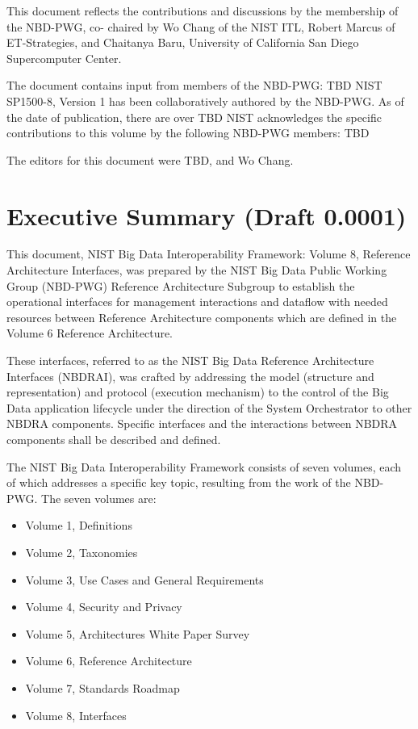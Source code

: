 \documentclass[11pt]{article}
\begin{document}
This document reflects the contributions and discussions by the membership of the NBD-PWG, co-
chaired by Wo Chang of the NIST ITL, Robert Marcus of ET-Strategies, and Chaitanya Baru, University 
of California San Diego Supercomputer Center. 

The document contains input from members of the NBD-PWG: TBD
NIST SP1500-8, Version 1 has been collaboratively authored by the NBD-PWG. As of the date of 
publication, there are over TBD
NIST acknowledges the specific contributions  to this volume by the following NBD-PWG members:
TBD

The editors for this document were TBD, and Wo Chang.

\newpage
{}

\section{Executive Summary (Draft 0.0001)}

This document, NIST Big Data Interoperability Framework: Volume 8, Reference Architecture Interfaces, 
was prepared by the NIST Big Data Public Working Group (NBD-PWG) Reference Architecture 
Subgroup to establish the operational interfaces for management interactions and dataflow with needed 
resources between Reference Architecture components which are defined in the Volume 6 Reference 
Architecture. 

These interfaces, referred to as the NIST Big Data Reference Architecture Interfaces (NBDRAI), was 
crafted by addressing the model (structure and representation) and protocol (execution mechanism) to the 
control of the Big Data application lifecycle under the direction of the System Orchestrator to other 
NBDRA components. Specific interfaces and the interactions between NBDRA components shall be 
described and defined.

The NIST Big Data Interoperability Framework consists of seven volumes, each of which addresses a 
specific key topic, resulting from the work of the NBD-PWG. The seven volumes are:

\begin{itemize}
\item	Volume 1, Definitions
\item	Volume 2, Taxonomies 
\item	Volume 3, Use Cases and General Requirements
\item	Volume 4, Security and Privacy 
\item	Volume 5, Architectures White Paper Survey
\item	Volume 6, Reference Architecture
\item	Volume 7, Standards Roadmap
\item       Volume 8, Interfaces
\end{itemize}
\end{document}
